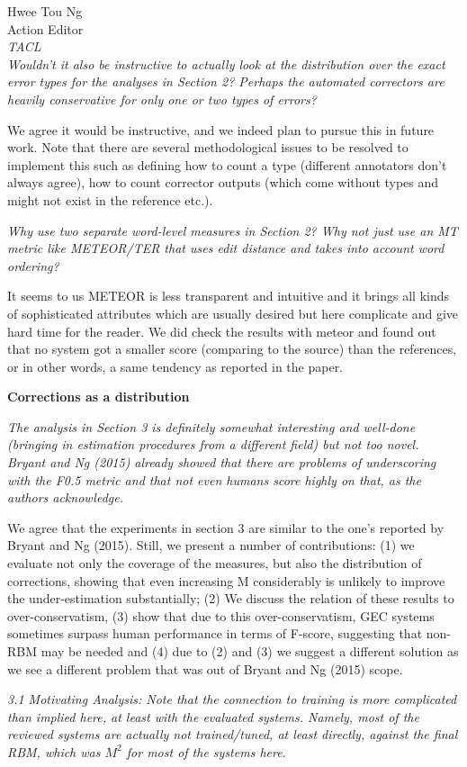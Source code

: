\documentclass[11pt,letterpaper]{letter}
\begin{document}
\begin{letter}{%
Hwee Tou Ng\\
Action Editor\\
{\em TACL}\\
}
\emph{Wouldn't it also be instructive to actually look at the distribution
	over the exact error types for the analyses in Section 2? Perhaps the automated correctors are heavily conservative for only one or two types of errors?
	}
	
	We agree it would be instructive, and we indeed plan to pursue this in future work. Note that there are several methodological issues to be resolved to implement this such as defining how to count a type (different annotators don't always agree), how to count corrector outputs (which come without types and might not exist in the reference etc.).
	
\emph{Why use two separate word-level measures in Section 2? Why not just use
	an MT metric like METEOR/TER that uses edit distance and takes into account
	word ordering?}

It seems to us METEOR is less transparent and intuitive and it brings all kinds of sophisticated attributes which are usually desired but here complicate and give hard time for the reader. We did check the results with meteor and found out that no system got a smaller score (comparing to the source) than the references, or in other words, a same tendency as reported in the paper.

{\bf Corrections as a distribution}

\emph{The analysis in Section 3 is definitely somewhat interesting and
	well-done (bringing in estimation procedures from a different field) but not
	too novel. Bryant and Ng (2015) already showed that there are problems of
	underscoring with the F0.5 metric and that not even humans score highly on
	that, as the authors acknowledge.
	}
	
We agree that the experiments in section 3 are similar to the one's reported by Bryant and Ng (2015). Still, we present a number of contributions: (1) we evaluate not only the coverage of the measures, but also the distribution of corrections, showing that even increasing M considerably is unlikely to improve the under-estimation substantially; (2) We discuss the relation of these results to over-conservatism, (3) show that due to this over-conservatism, GEC systems sometimes surpass human performance in terms of F-score, suggesting that non-RBM may be needed and (4) due to (2) and (3) we suggest a different solution as we see a different problem that was out of Bryant and Ng (2015) scope.

\emph{3.1 Motivating Analysis: Note that the connection to training is more
	complicated than implied here, at least with the evaluated systems. Namely,
	most of the reviewed systems are actually not trained/tuned, at least
	directly, against the final RBM, which was $M^2$ for most of the systems here.
	}
	

\end{letter}
\end{document}
